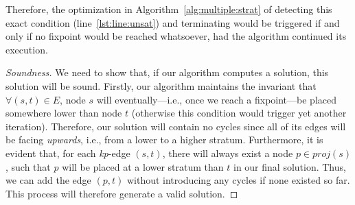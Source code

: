 \noindent
Therefore, the optimization in Algorithm~\ref{alg:multiple:strat} of
detecting this exact condition (line~\ref{lst:line:unsat}) and
terminating would be triggered if and only if no fixpoint would be
reached whatsoever, had the algorithm continued its execution.

\begin{proof}[Soundness]
  We need to show that, if our algorithm computes a solution, this
  solution will be sound. Firstly, our algorithm maintains the
  invariant that $\forall (s,t) \in E$, node $s$ will
  eventually---i.e., once we reach a fixpoint---be placed somewhere lower
  than node $t$ (otherwise this condition would trigger yet another
  iteration). Therefore, our solution will contain no cycles since all
  of its edges will be facing \emph{upwards}, i.e., from a lower to a
  higher stratum. Furthermore, it is evident that, for each
  \emph{kp}-edge $(s,t)$, there will always exist a node $p \in
  \textit{proj}(s)$, such that $p$ will be placed at a lower stratum than $t$
  in our final solution. Thus, we can add the edge $(p,t)$ without
  introducing any cycles if none existed so far. This process will
  therefore generate a valid solution.
\end{proof}

